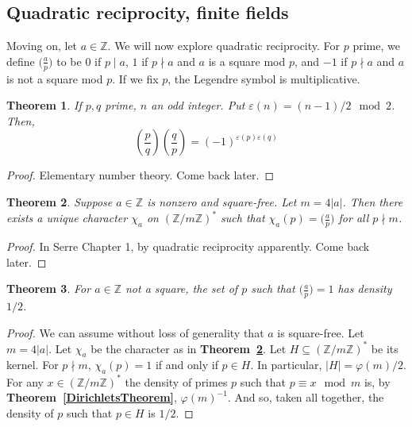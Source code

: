 \documentclass[12pt]{article}
\newcommand{\ints}{\mathbb{Z}}
\newcommand{\intsmod}[1]{\ints / #1 \ints}
\newcommand{\tref}[1]{\textbf{Theorem~\ref{#1}}}
\newtheorem{thm}{Theorem}
\numberwithin{equation}{section}
\numberwithin{thm}{section}
\numberwithin{lemma}{section}
\numberwithin{cor}{section}
\begin{document}
\subsection{Quadratic reciprocity, finite fields}

Moving on, let $a \in \ints$. We will now explore quadratic reciprocity. For $p$ prime, we define $\big(\frac{a}{p}\big)$ to be $0$ if $p \mid a$, $1$ if $p \nmid a$ and $a$ is a square mod $p$, and $-1$ if $p \nmid a$ and $a$ is not a square mod $p$. If we fix $p$, the Legendre symbol is multiplicative.

\begin{thm}\label{QuadraticReciprocity}
  If $p, q$ prime, $n$ an odd integer. Put $\varepsilon(n) = (n-1)/2 \mod 2$. Then, \begin{equation*}
    \left( \frac{p}{q} \right) \left( \frac{q}{p} \right) = (-1)^{\varepsilon(p) \varepsilon(q)}
  \end{equation*}
\end{thm}
\begin{proof}
  Elementary number theory. Come back later.
\end{proof}

\begin{thm}\label{CharacterExtensionOfLegendreSymbol}
  Suppose $a \in \ints$ is nonzero and square-free. Let $m = 4 |a|$. Then there exists a unique character $\chi_a$ on $(\intsmod{m})^*$ such that $\chi_a(p) = \big(\frac{a}{p}\big)$ for all $p \nmid m$.
\end{thm}
\begin{proof}
  In Serre Chapter 1, by quadratic reciprocity apparently. Come back later.
\end{proof}

\begin{thm}\label{PrimeSquaresHaveHalfDensity}
  For $a \in \ints$ not a square, the set of $p$ such that $\big(\frac{a}{p} \big) = 1$ has density $1/2$.
\end{thm}
\begin{proof}
  We can assume without loss of generality that $a$ is square-free. Let $m = 4 |a|$. Let $\chi_a$ be the character as in \tref{CharacterExtensionOfLegendreSymbol}. Let $H \subseteq (\intsmod{m})^*$ be its kernel. For $p \nmid m$, $\chi_a(p) = 1$ if and only if $p \in H$. In particular, $|H| = \varphi(m)/2$. For any $x \in (\intsmod{m})^*$ the density of primes $p$ such that $p \equiv x \mod m$ is, by \tref{DirichletsTheorem}, $\varphi(m)^{-1}$. And so, taken all together, the density of $p$ such that $p \in H$ is $1/2$.
\end{proof}
\end{document}
